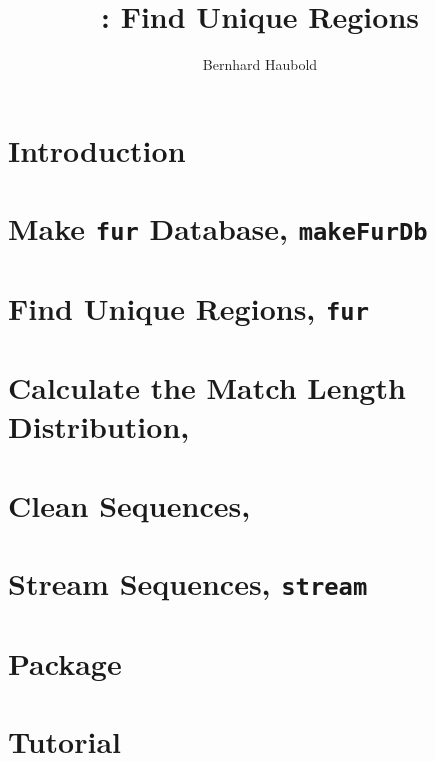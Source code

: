 \documentclass[a4paper]{report}
\begin{document}
\pagestyle{noweb}

\title{: Find Unique Regions}
\author{Bernhard Haubold}
\maketitle

\tableofcontents

\chapter{Introduction}\label{sec:intro}

\chapter{Make \texttt{fur} Database, \texttt{makeFurDb}}\label{ch:makeFurDb}

\chapter{Find Unique Regions, \texttt{fur}}

\chapter{Calculate the Match Length Distribution, }\label{ch:mad}

\chapter{Clean Sequences, }

\chapter{Stream Sequences, \texttt{stream}}

\chapter{Package }

\chapter{Tutorial}\label{ch:tut}



\end{document}
